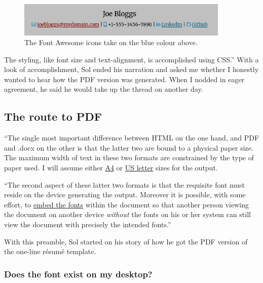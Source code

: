 \documentclass[
  british,
  a4paper,
  rgb,
  dvipsnames,
  svgnames,
  hyphens]{article}
\begin{document}
\begin{figure}
\centering
\includegraphics[width=0.9\textwidth,height=\textheight]{images/opening-html.png}
\caption{The Font Awesome icons take on the blue colour above.}
\end{figure}

The styling, like font size and text-alignment, is accomplished using
CSS.'' With a look of accomplishment, Sol ended his narration and asked
me whether I honestly wanted to hear how the PDF version was generated.
When I nodded in eager agreement, he said he would take up the thread on
another day.

\hypertarget{the-route-to-pdf}{%
\subsection{The route to PDF}\label{the-route-to-pdf}}

``The single most important difference between HTML on the one hand, and
PDF and .docx on the other is that the latter two are bound to a
physical paper size. The maximum width of text in these two formats are
constrained by the type of paper used. I will assume either
\href{https://en.wikipedia.org/wiki/ISO_216\#A_series}{A4} or
\href{https://en.wikipedia.org/wiki/Letter_(paper_size)}{US letter}
sizes for the output.

``The second aspect of these latter two formats is that the requisite
font must reside on the device generating the output. Moreover it is
possible, with some effort, to
\href{https://en.wikipedia.org/wiki/Font_embedding}{embed the fonts}
within the document so that another person viewing the document on
another device \emph{without} the fonts on his or her system can still
view the document with precisely the intended fonts.''

With this preamble, Sol started on his story of how he got the PDF
version of the one-line résumé template.

\hypertarget{does-the-font-exist-on-my-desktop}{%
\subsubsection{Does the font exist on my
desktop?}\label{does-the-font-exist-on-my-desktop}}
\end{document}
